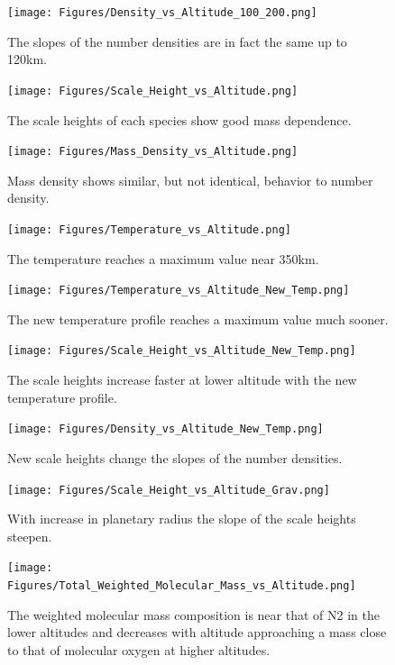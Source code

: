 \documentclass[12pt,letterpaper]{article}
\begin{document}
\begin{figure}[htb]
\texttt{[image: Figures/Density\_vs\_Altitude\_100\_200.png]}
\caption{The slopes of the number densities are in fact the same up to 120km.}
\label{fig:Density vs Altitude 2}
\end{figure}

\begin{figure}[htb]
\texttt{[image: Figures/Scale\_Height\_vs\_Altitude.png]}
\caption{The scale heights of each species show good mass dependence.}
\label{fig:Scale Height vs Altitude 1}
\end{figure}

\begin{figure}[htb]
\texttt{[image: Figures/Mass\_Density\_vs\_Altitude.png]}
\caption{Mass density shows similar, but not identical, behavior to number density.}
\label{fig:Mass Density vs Altitude 1}
\end{figure}

\begin{figure}[htb]
\texttt{[image: Figures/Temperature\_vs\_Altitude.png]}
\caption{The temperature reaches a maximum value near 350km.}
\label{fig:Temperature vs Altitude 1}
\end{figure}

\begin{figure}[htb]
\texttt{[image: Figures/Temperature\_vs\_Altitude\_New\_Temp.png]}
\caption{The new temperature profile reaches a maximum value much sooner.}
\label{fig:Temperature vs Altitude 2}
\end{figure}

\begin{figure}[htb]
\texttt{[image: Figures/Scale\_Height\_vs\_Altitude\_New\_Temp.png]}
\caption{The scale heights increase faster at lower altitude with the new temperature profile.}
\label{fig:Scale Height vs Altitude 2}
\end{figure}

\begin{figure}[htb]
\texttt{[image: Figures/Density\_vs\_Altitude\_New\_Temp.png]}
\caption{New scale heights change the slopes of the number densities.}
\label{fig:Density vs Altitude 3}
\end{figure}

\begin{figure}[htb]
\texttt{[image: Figures/Scale\_Height\_vs\_Altitude\_Grav.png]}
\caption{With increase in planetary radius the slope of the scale heights steepen.}
\label{fig:Scale Height vs Altitude 3}
\end{figure}

\begin{figure}[htb]
\texttt{[image: Figures/Total\_Weighted\_Molecular\_Mass\_vs\_Altitude.png]}
\caption{The weighted molecular mass composition is near that of N2 in the lower altitudes and decreases with altitude approaching a mass close to that of molecular oxygen at higher altitudes.}
\label{fig:Total Weighted Molecular Mass vs Altitude 1}
\end{figure}
\end{document}
